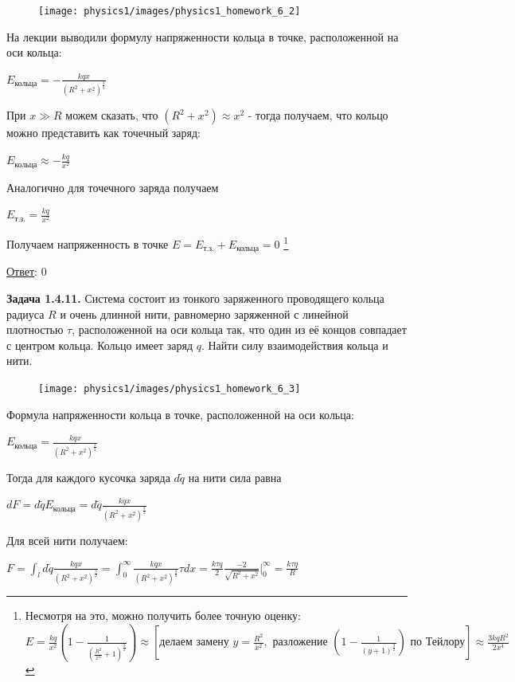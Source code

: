 \documentclass[12pt]{article}
\begin{document}
\begin{minipage}{\textwidth}
    \begin{figure}
        \texttt{[image: physics1/images/physics1\_homework\_6\_2]}
    \end{figure}

    На лекции выводили формулу напряженности кольца в точке, расположенной на оси кольца: 

    $E_{\text{кольца}} = -\frac{kqx}{(R^2 + x^2)^{\frac{3}{2}}}$

    При $x \gg R$ можем сказать, что $(R^2 + x^2) \approx x^2$ - тогда получаем, что кольцо можно представить как точечный заряд:

    $E_{\text{кольца}} \approx -\frac{kq}{x^2}$

    Аналогично для точечного заряда получаем 
    
    $E_{\text{т.з.}} = \frac{kq}{x^2}$
\end{minipage}

Получаем напряженность в точке $E = E_{\text{т.з.}} + E_{\text{кольца}} = 0$
\footnote{Несмотря на это, можно получить более точную оценку: \\
$E = \frac{kq}{x^2} \left(1 - \frac{1}{\left(\frac{R^2}{x^2} + 1\right)^{\frac{3}{2}}}\right) \approx \left[\text{делаем замену } y = \frac{R^2}{x^2}, \text{ разложение } \left(1 - \frac{1}{(y + 1)^{\frac{3}{2}}}\right) \text{ по Тейлору}\right] \approx \frac{3kqR^2}{2x^4}$}

\underline{Ответ}: 0

\begin{tcolorbox}
    \textbf{Задача 1.4.11.} Система состоит из тонкого заряженного
    проводящего кольца радиуса $R$ и очень длинной нити, равномерно
    заряженной с линейной плотностью $\tau$, расположенной на оси
    кольца так, что один из её концов совпадает с центром кольца.
    Кольцо имеет заряд $q$. Найти силу взаимодействия кольца и нити.
\end{tcolorbox}

\begin{minipage}{\textwidth}
    \begin{figure}
        \texttt{[image: physics1/images/physics1\_homework\_6\_3]}
    \end{figure}

    Формула напряженности кольца в точке, расположенной на оси кольца: 

    $E_{\text{кольца}} = \frac{kqx}{(R^2 + x^2)^{\frac{3}{2}}}$

    Тогда для каждого кусочка заряда $d\tilde{q}$ на нити сила равна

    $dF = d\tilde{q} E_{\text{кольца}} = d\tilde{q} \frac{kqx}{(R^2 + x^2)^{\frac{3}{2}}}$

    Для всей нити получаем: 

    $F = \int_l d\tilde{q} \frac{kqx}{(R^2 + x^2)^{\frac{3}{2}}} = \int_0^\infty \frac{kqx}{(R^2 + x^2)^{\frac{3}{2}}} \tau dx = 
    \frac{k\tau q}{2} \frac{-2}{\sqrt{R^2 + x^2}} \Big|_0^\infty = \frac{k\tau q}{R}$
\end{minipage}
\end{document}
